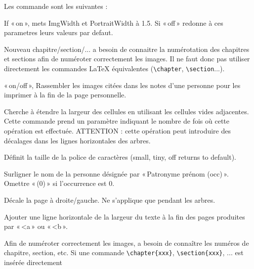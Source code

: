Les commande \gwtol{} sont les suivantes :

\begin{description}[style=nextline]
\item[Arbres/Trees] If «\,on\,», mets ImgWidth et PortraitWidth à 1.5.
Si «\,off\,» redonne à ces parametres leurs valeurs par defaut.
\item[Chapter/Section/SubSection/SubSubSection] Nouveau chapitre/section/...
\gwtol{} a besoin de connaitre la numérotation des chapitres et sections afin
de numéroter correctement les images. Il ne faut donc pas utiliser directement
les commandes \LaTeX{} équivalentes (\verb|\chapter|, \verb|\section|...).
\item[CollectImages] «\,on/off\,», Rassembler les images citées dans les notes
d'une personne pour les imprimer à la fin de la page personnelle.
\item[Expand] Cherche à étendre la largeur des cellules en utilisant
les cellules vides adjacentes. Cette commande prend un paramètre indiquant
le nombre de fois où cette opération est effectuée. ATTENTION : cette opération
peut introduire des décalages dans les lignes horizontales des arbres.
\item[FontSize] Définit la taille de la police de caractères\label{fontsize}
(small, tiny, off returns to default).
\item[HighLight] Surligner le nom de la personne désignée par
«\,Patronyme prénom (occ)\,». Omettre «\,(0)\,» si l'occurrence est 0.
\item[Hoffset] Décale la page à droite/gauche. Ne s'applique que pendant les arbres.
\item[Hrule] Ajouter une ligne horizontale de la largeur du texte à la fin
des pages produites par «\,<a\,» ou «\,<b\,».
\item[Incr] Afin de numéroter correctement les images, \gwtol{} a besoin de
connaître les numéros de chapitre, section, etc. Si une commande
\verb|\chapter{xxx}|, \verb|\section{xxx}|, ... est insérée directement

\end{description}
